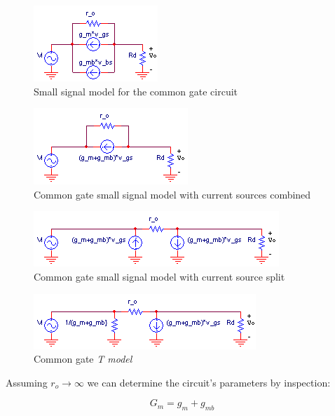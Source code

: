 \begin{figure}[h]
	\centering
		\includegraphics{schematics/ss_commongate_initial.PNG}
	\caption{Small signal model for the common gate circuit}
	\label{fig:ss_commongate_initial}
\end{figure}

\begin{figure}[h]
	\centering
		\includegraphics{schematics/ss_commongate_combine.PNG}
	\caption{Common gate small signal model with current sources combined}
	\label{fig:ss_commongate_combine}
\end{figure}

\begin{figure}[h]
	\centering
		\includegraphics{schematics/ss_commongate_split.PNG}
	\caption{Common gate small signal model with current source split}
	\label{fig:ss_commongate_split}
\end{figure}

\begin{figure}[h]
	\centering
		\includegraphics{schematics/ss_commongate_T_model.PNG}
		\caption{Common gate \textsl{T model}}
	\label{fig:ss_commongate_T_model}
\end{figure}

Assuming $r_{o} \to \infty$ we can determine the circuit's parameters by inspection:

\begin{equation}
G_{m} = g_{m} + g_{mb}
\end{equation}

